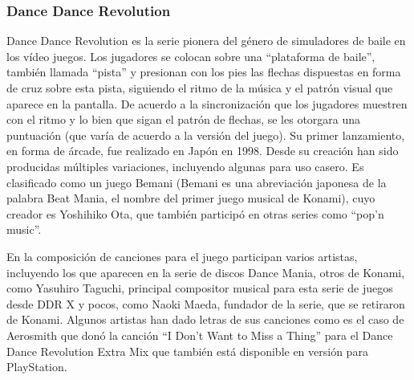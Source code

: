 \documentclass[a4paper,11pt,oneside]{book}
\begin{document}
\subsubsection{Dance Dance Revolution}
Dance Dance Revolution es la serie pionera del género de simuladores de baile en los vídeo juegos. Los jugadores se colocan sobre una ``plataforma de baile'', también llamada ``pista'' y presionan con los pies las flechas dispuestas en forma de cruz sobre esta pista, siguiendo el ritmo de la música y el patrón visual que aparece en la pantalla. De acuerdo a la sincronización que los jugadores muestren con el ritmo y lo bien que sigan el patrón de flechas, se les otorgara una puntuación (que varía de acuerdo a la versión del juego). Su primer lanzamiento, en forma de árcade, fue realizado en Japón en 1998. Desde su creación han sido producidas múltiples variaciones, incluyendo algunas para uso casero. Es clasificado como un juego Bemani (Bemani es una abreviación japonesa de la palabra Beat Mania, el nombre del primer juego musical de Konami), cuyo creador es Yoshihiko Ota, que también participó en otras series como ``pop'n music''.

En la composición de canciones para el juego participan varios artistas, incluyendo los que aparecen en la serie de discos Dance Mania, otros de Konami, como Yasuhiro Taguchi, principal compositor musical para esta serie de juegos desde DDR X y pocos, como Naoki Maeda, fundador de la serie, que se retiraron de Konami. Algunos artistas han dado letras de sus canciones como es el caso de Aerosmith que donó la canción ``I Don't Want to Miss a Thing'' para el Dance Dance Revolution Extra Mix que también está disponible en versión para PlayStation.
\end{document}
